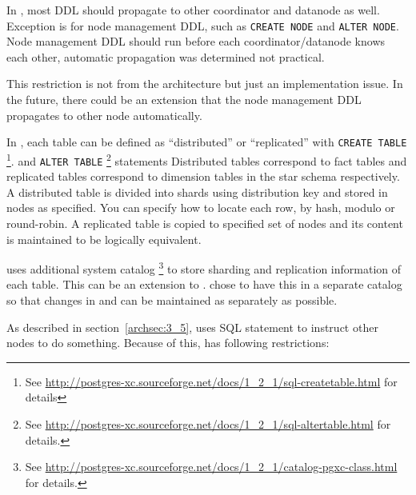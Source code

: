 
  In \XC, most DDL should propagate to other coordinator and datanode as well.
  Exception is for node management DDL, such as \texttt{CREATE NODE} and \texttt{ALTER NODE}.  
  Node management DDL should run before each coordinator/datanode knows each other,
  automatic propagation was determined not practical.
  
  This restriction is not from the architecture but just an implementation issue.
  In the future, there could be an extension that the node management DDL propagates to
  other node automatically.




  In \XC, each table can be defined as ``distributed'' or ``replicated'' with \texttt{CREATE TABLE}
  \footnote{See \url{http://postgres-xc.sourceforge.net/docs/1_2_1/sql-createtable.html} for details}.
  and \texttt{ALTER TABLE}
  \footnote{See \url{http://postgres-xc.sourceforge.net/docs/1_2_1/sql-altertable.html} for details.}
  statements
  Distributed tables correspond to fact tables and replicated tables correspond to dimension tables
  in the star schema respectively.
  A distributed table is divided into shards using distribution key and stored in nodes as specified.
  You can specify how to locate each row, by hash, modulo or round-robin.
  A replicated table is copied to specified set of nodes and its content is maintained to be logically
  equivalent.
  
  \XC{} uses additional system catalog %
  \footnote{See \url{http://postgres-xc.sourceforge.net/docs/1_2_1/catalog-pgxc-class.html} for details.}
  to store sharding and replication information of each table.
  This can be an extension to .
  \XC{} chose to have this in a separate catalog so that changes in \PG{} and \XC{} can be maintained
  as separately as possible.




  As described in section~\ref{archsec:3_5}, \XC{} uses SQL statement to instruct other nodes
  to do something.
  Because of this, \XC{} has following restrictions:
  
